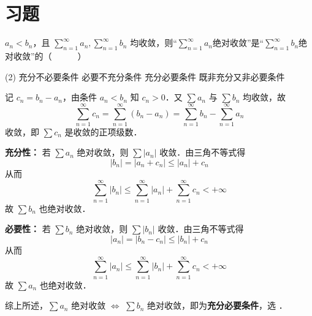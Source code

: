 \documentclass[12pt, a4paper, oneside, UTF8]{ctexbook}
\begin{document}
\section{习题}
\begin{exercise}
    $a_n < b_n$，且 $\displaystyle\sum_{n=1}^{\infty}a_n,\sum_{n=1}^{\infty}b_n$ 均收敛，则“$\displaystyle\sum_{n=1}^{\infty}a_n$绝对收敛”是“$\displaystyle\sum_{n=1}^{\infty}b_n$绝对收敛”的（~~~~~~）
    \begin{tasks}[style = itemize, label=\Alph*.](2)
        \task 充分不必要条件
        \task 必要不充分条件
        \task 充分必要条件
        \task 既非充分又非必要条件
    \end{tasks}
\end{exercise}
\begin{solution}
    记 $c_n = b_n - a_n$，由条件 $a_n < b_n$ 知 $c_n > 0$．又 $\sum a_n$ 与 $\sum b_n$ 均收敛，故
    \[ \sum_{n=1}^{\infty} c_n = \sum_{n=1}^{\infty} (b_n - a_n) = \sum_{n=1}^{\infty} b_n - \sum_{n=1}^{\infty} a_n \]
    收敛，即 $\sum c_n$ 是收敛的正项级数．

    \textbf{充分性：} 若 $\sum a_n$ 绝对收敛，则 $\sum |a_n|$ 收敛．由三角不等式得
    \[ |b_n| = |a_n + c_n| \le |a_n| + c_n \]
    从而
    \[ \sum_{n=1}^{\infty} |b_n| \le \sum_{n=1}^{\infty} |a_n| + \sum_{n=1}^{\infty} c_n < +\infty \]
    故 $\sum b_n$ 也绝对收敛．

    \textbf{必要性：} 若 $\sum b_n$ 绝对收敛，则 $\sum |b_n|$ 收敛．由三角不等式得
    \[ |a_n| = |b_n - c_n| \le |b_n| + c_n \]
    从而
    \[ \sum_{n=1}^{\infty} |a_n| \le \sum_{n=1}^{\infty} |b_n| + \sum_{n=1}^{\infty} c_n < +\infty \]
    故 $\sum a_n$ 也绝对收敛．

    综上所述，$\sum a_n$ 绝对收敛 $\iff$ $\sum b_n$ 绝对收敛，即为\textbf{充分必要条件}，选 ．
\end{solution}
\end{document}
